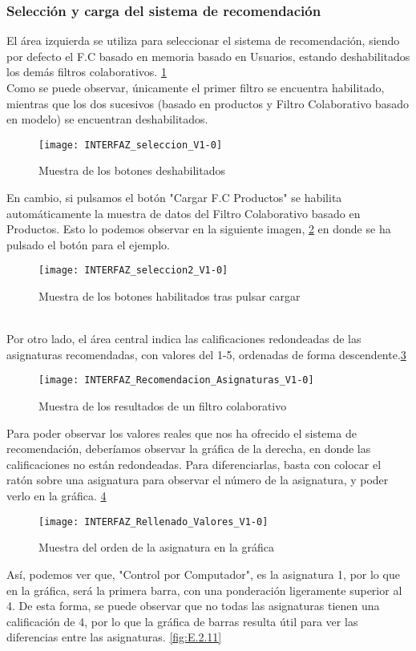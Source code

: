 \subsubsection{Selección y carga del sistema de recomendación}
El área izquierda se utiliza para seleccionar el sistema de recomendación, siendo por defecto el F.C basado en memoria basado en Usuarios, estando deshabilitados los demás filtros colaborativos. \ref{fig:E.2.7} \\Como se puede observar, únicamente el primer filtro se encuentra habilitado, mientras que los dos sucesivos (basado en productos y  Filtro Colaborativo basado en modelo) se encuentran deshabilitados. 
\begin{figure}[h]
\centering
\texttt{[image: INTERFAZ\_seleccion\_V1-0]}
\caption{Muestra de los botones deshabilitados}
\label{fig:E.2.7}
\end{figure}
En cambio, si pulsamos el botón "Cargar F.C Productos" se habilita automáticamente la muestra de datos del Filtro Colaborativo basado en Productos. Esto lo podemos observar en la siguiente imagen, \ref{fig:E.2.8} en donde se ha pulsado el botón para el ejemplo. 
\begin{figure}[h]
\centering
\texttt{[image: INTERFAZ\_seleccion2\_V1-0]}
\caption{Muestra de los botones habilitados tras pulsar cargar}
\label{fig:E.2.8}
\end{figure}
\\
Por otro lado, el área central indica las calificaciones redondeadas de las asignaturas recomendadas, con valores del 1-5, ordenadas de forma descendente.\ref{fig:E.2.9} 
\begin{figure}[h]
\centering
\texttt{[image: INTERFAZ\_Recomendacion\_Asignaturas\_V1-0]}
\caption{Muestra de los resultados de un filtro colaborativo}
\label{fig:E.2.9}
\end{figure}
Para poder observar los valores reales que nos ha ofrecido el sistema de recomendación, deberíamos observar la gráfica de la derecha, en donde las calificaciones no están redondeadas. Para diferenciarlas, basta con colocar el ratón sobre una asignatura para observar el número de la asignatura, y poder verlo en la gráfica. \ref{fig:E.2.10} 
\begin{figure}[h]
\centering
\texttt{[image: INTERFAZ\_Rellenado\_Valores\_V1-0]}
\caption{Muestra del orden de la asignatura en la gráfica}
\label{fig:E.2.10}
\end{figure}
Así, podemos ver que, "Control por Computador", es la asignatura 1, por lo que en la gráfica, será la primera barra, con una ponderación ligeramente superior al 4. De esta forma, se puede observar que no todas las asignaturas tienen una calificación de 4, por lo que la gráfica de barras resulta útil para ver las diferencias entre las asignaturas. \ref{fig:E.2.11} 
